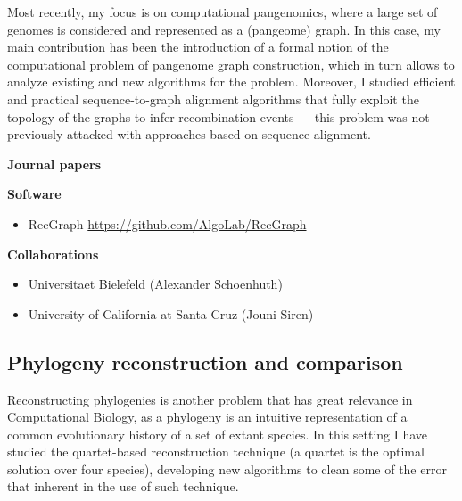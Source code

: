 \documentclass[11pt,a4paper,roman]{moderncv}
\begin{document}
Most recently, my focus is on computational pangenomics, where a large set of
genomes is considered and represented as a (pangeome) graph.
In this case, my main contribution has been the introduction of a formal notion of the computational
problem of pangenome graph construction, which in turn allows to analyze
existing and new algorithms for the problem.
Moreover, I studied efficient and practical
sequence-to-graph alignment algorithms that fully exploit the topology of the
graphs to infer recombination events --- this problem was not previously
attacked with approaches based on sequence alignment.


\textbf{Journal papers}

\cite{avilacartes2024a}
\cite{avilacartes2024}
\cite{baaijensComputationalGraphPangenomics2022}
\cite{DBLP:journals/bioinformatics/DentiPPCVRB21}
\cite{DBLP:journals/ipl/BonizzoniVDP10}
\cite{DBLP:journals/tcbb/BonizzoniVDFRV07}
\cite{DBLP:journals/informs/JustV04}
\cite{DBLP:journals/dam/BonizzoniVM01}
\cite{DBLP:journals/tcs/BonizzoniV01}

\textbf{Software}

\begin{itemize}
	\item
	      RecGraph \url{https://github.com/AlgoLab/RecGraph}
\end{itemize}

\textbf{Collaborations}

\begin{itemize}
	\item
	      Universitaet Bielefeld (Alexander Schoenhuth)
	\item
	      University of California at Santa Cruz (Jouni Siren)
\end{itemize}

\subsection{Phylogeny reconstruction and
	comparison}\label{phylogeny-reconstruction-and-comparison}

Reconstructing phylogenies is another problem that has great relevance
in Computational Biology, as a phylogeny is an intuitive representation
of a common evolutionary history of a set of extant species. In this
setting I have studied the quartet-based reconstruction technique (a
quartet is the optimal solution over four species), developing new
algorithms to clean some of the error that inherent in the use of such
technique.
\end{document}
